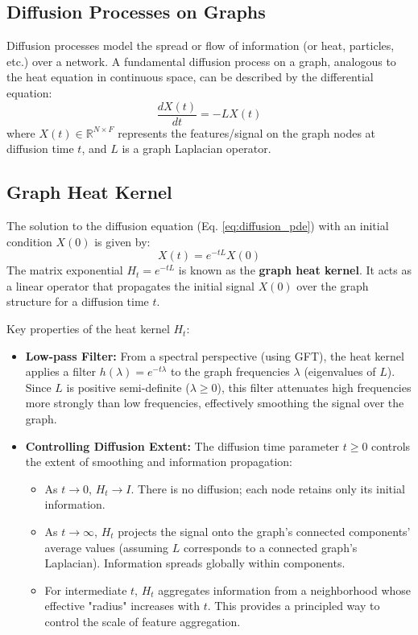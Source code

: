 \subsection{Diffusion Processes on Graphs}
Diffusion processes model the spread or flow of information (or heat, particles, etc.) over a network. A fundamental diffusion process on a graph, analogous to the heat equation in continuous space, can be described by the differential equation:
\begin{equation}
    \frac{dX(t)}{dt} = -L X(t)
    \label{eq:diffusion_pde}
\end{equation}
where $X(t) \in \mathbb{R}^{N \times F}$ represents the features/signal on the graph nodes at diffusion time $t$, and $L$ is a graph Laplacian operator.

\subsection{Graph Heat Kernel}
The solution to the diffusion equation (Eq. \ref{eq:diffusion_pde}) with an initial condition $X(0)$ is given by:
\begin{equation}
    X(t) = e^{-tL} X(0)
    \label{eq:diffusion_solution}
\end{equation}
The matrix exponential $H_t = e^{-tL}$ is known as the \textbf{graph heat kernel}. It acts as a linear operator that propagates the initial signal $X(0)$ over the graph structure for a diffusion time $t$.

Key properties of the heat kernel $H_t$:
\begin{itemize}
    \item \textbf{Low-pass Filter:} From a spectral perspective (using GFT), the heat kernel applies a filter $h(\lambda) = e^{-t\lambda}$ to the graph frequencies $\lambda$ (eigenvalues of $L$). Since $L$ is positive semi-definite ($\lambda \ge 0$), this filter attenuates high frequencies more strongly than low frequencies, effectively smoothing the signal over the graph.
    \item \textbf{Controlling Diffusion Extent:} The diffusion time parameter $t \ge 0$ controls the extent of smoothing and information propagation:
        \begin{itemize}
            \item As $t \to 0$, $H_t \to I$. There is no diffusion; each node retains only its initial information.
            \item As $t \to \infty$, $H_t$ projects the signal onto the graph's connected components' average values (assuming $L$ corresponds to a connected graph's Laplacian). Information spreads globally within components.
            \item For intermediate $t$, $H_t$ aggregates information from a neighborhood whose effective "radius" increases with $t$. This provides a principled way to control the scale of feature aggregation.
        \end{itemize}
\end{itemize}

